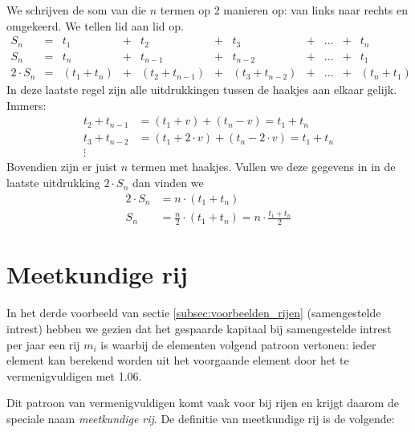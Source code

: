 We schrijven de som van die $n$ termen op 2 manieren op: van links naar
rechts en omgekeerd. We tellen lid aan lid op.
\begin{displaymath}
    \begin{array}{ccccccccccc}
    S_{n} & = & t_{1} & + & t_{2} & + & t_{3} & + &
    \ldots & + & t_{n}  \\
    S_{n} & = & t_{n} & + & t_{n-1} & + & t_{n-2} & + &
    \ldots & + & t_{1}  \\
    \hline
    2\cdot S_{n} & = & (t_{1}+t_{n}) & + & (t_{2}+t_{n-1}) & + &
    (t_{3}+t_{n-2}) & + & \ldots & + & (t_{n}+t_{1})
\end{array}
\end{displaymath}
In deze laatste regel zijn alle uitdrukkingen tussen de haakjes aan
elkaar gelijk.
Immers:
\begin{align*}
    t_{2}+t_{n-1} &=  (t_{1}+ v)+(t_{n}-v)=t_{1}+t_{n} \\
    t_{3}+t_{n-2} &=  (t_{1}+2\cdot v)+(t_{n}-2\cdot v)= t_{1}+t_{n} \\
     \vdots & 
\end{align*}
Bovendien zijn er juist $n$ termen met haakjes.
Vullen we deze gegevens in in de laatste uitdrukking $2\cdot S_{n}$
dan vinden we
\begin{align*}
    2\cdot S_{n} &=  n\cdot (t_{1}+t_{n})  \\
    S_{n} &= \frac{n}{2}\cdot (t_{1}+t_{n})=n \cdot \frac{t_{1}+t_{n}}{2}
  \end{align*}

\section{Meetkundige rij}
\label{sec:MR}
In het derde voorbeeld van sectie \ref{subsec:voorbeelden_rijen} (samengestelde intrest) hebben we gezien dat het gespaarde kapitaal bij samengestelde  intrest per jaar een rij $m_i$ is waarbij de elementen volgend patroon vertonen:  ieder element kan berekend worden uit het voorgaande element door het te vermenigvuldigen met \num{1.06}.

Dit patroon van vermenigvuldigen komt vaak voor bij rijen en krijgt daarom de speciale naam \emph{meetkundige  rij}. De definitie van meetkundige rij is de volgende:
